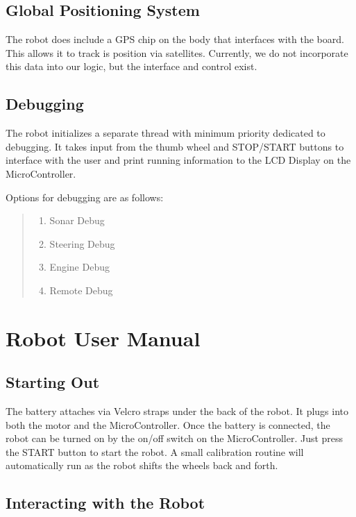 \documentclass[12pt]{article}
\begin{document}
\clearpage
\subsection{Global Positioning System}
The robot does include a GPS chip on the body that interfaces with the board.  This allows it to track is position via satellites.  Currently, we do not incorporate this data into our logic, but the interface and control exist.

\clearpage
\subsection{Debugging}
The robot initializes a separate thread with minimum priority dedicated to debugging.  It takes input from the thumb wheel and STOP/START buttons to interface with the user and print running information to the LCD Display on the MicroController.

Options for debugging are as follows:
\begin{quote}
\begin{enumerate}
\item Sonar Debug
\item Steering Debug
\item Engine Debug
\item Remote Debug
\end{enumerate}
\end{quote}





\clearpage
\section{Robot User Manual}
\subsection{Starting Out}
The battery attaches via Velcro straps under the back of the robot.  It plugs into both the motor and the MicroController.  Once the battery is connected, the robot can be turned on by the on/off switch on the MicroController.
\vspace{2mm}
Just press the START button to start the robot.  A small calibration routine will automatically run as the robot shifts the wheels back and forth.

\subsection{Interacting with the Robot}
\end{document}
